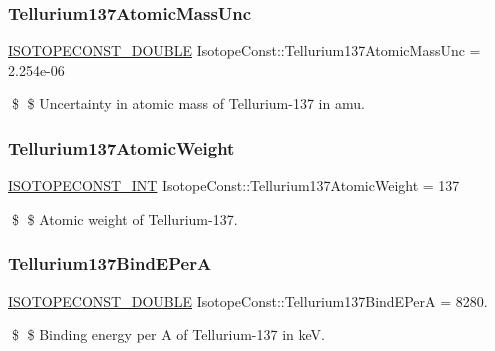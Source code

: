 \subsubsection{\texorpdfstring{Tellurium137\+Atomic\+Mass\+Unc}{Tellurium137AtomicMassUnc}}
{\footnotesize\ttfamily \mbox{\hyperlink{group___isotope_const-_macros_ga8f45a7272ce02c0b4c65c44636ed719a}{I\+S\+O\+T\+O\+P\+E\+C\+O\+N\+S\+T\+\_\+\+D\+O\+U\+B\+LE}} Isotope\+Const\+::\+Tellurium137\+Atomic\+Mass\+Unc = 2.\+254e-\/06}

\$ \$ Uncertainty in atomic mass of Tellurium-\/137 in amu. \mbox{\label{group___isotope_const-_tellurium-_te137_ga89827280f25c8a5a24df27f7f2ea5e37}} 
\subsubsection{\texorpdfstring{Tellurium137\+Atomic\+Weight}{Tellurium137AtomicWeight}}
{\footnotesize\ttfamily \mbox{\hyperlink{group___isotope_const-_macros_ga5f18360b3e99483a35c32d789e62621c}{I\+S\+O\+T\+O\+P\+E\+C\+O\+N\+S\+T\+\_\+\+I\+NT}} Isotope\+Const\+::\+Tellurium137\+Atomic\+Weight = 137}

\$ \$ Atomic weight of Tellurium-\/137. \mbox{\label{group___isotope_const-_tellurium-_te137_ga495e67ed43f1690526e8ac42a00b762b}} 
\subsubsection{\texorpdfstring{Tellurium137\+Bind\+E\+PerA}{Tellurium137BindEPerA}}
{\footnotesize\ttfamily \mbox{\hyperlink{group___isotope_const-_macros_ga8f45a7272ce02c0b4c65c44636ed719a}{I\+S\+O\+T\+O\+P\+E\+C\+O\+N\+S\+T\+\_\+\+D\+O\+U\+B\+LE}} Isotope\+Const\+::\+Tellurium137\+Bind\+E\+PerA = 8280.}

\$ \$ Binding energy per A of Tellurium-\/137 in keV. \mbox{\label{group___isotope_const-_tellurium-_te137_ga6725bbf8a6af4538800fc6660cbd39f1}} 
